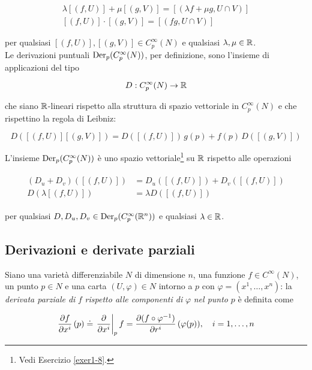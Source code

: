 \begin{gather}
	\lambda [(f,U)] + \mu [(g,V)] = [(\lambda f + \mu g , U \cap V)] \\
	[(f,U)] \cdot [(g,V)] = [(f g , U \cap V)]
\end{gather}

per qualsiasi $ [(f,U)], [(g,V)] \in C_{p}^{\infty}(N) $ e qualsiasi $ \lambda, \mu \in \mathbb{R} $. \\
Le derivazioni puntuali $ \operatorname{Der}_{p}(C_{p}^{\infty}(N)) $, per definizione, sono l'insieme di applicazioni del tipo

\begin{equation}
	D : C_{p}^{\infty}(N) \to \mathbb{R}
\end{equation}

che siano $ \mathbb{R} $-lineari rispetto alla struttura di spazio vettoriale in $ C_{p}^{\infty}(N) $ e che rispettino la regola di Leibniz:

\begin{equation}
	D([(f,U)] [(g,V)]) = D([(f,U)]) \, g(p) + f(p) \, D([(g,V)])
\end{equation}

L'insieme $ \operatorname{Der}_{p}(C_{p}^{\infty}(N)) $ è uno spazio vettoriale\footnote{%
	Vedi Esercizio \ref{exer1-8}.%
} su $ \mathbb{R} $ rispetto alle operazioni

\begin{align}
	\begin{split}
		(D_{u} + D_{v}) ([(f,U)]) &= D_{u}([(f,U)]) + D_{v}([(f,U)]) \\
		D (\lambda [(f,U)]) &= \lambda D ([(f,U)])
	\end{split}
\end{align}

per qualsiasi $ D,D_{u},D_{v} \in \operatorname{Der}_{p}(C_{p}^{\infty}(\mathbb{R}^{n})) $ e qualsiasi $ \lambda \in \mathbb{R} $.

\subsection{Derivazioni e derivate parziali}

Siano una varietà differenziabile $ N $ di dimensione $ n $, una funzione $ f \in C^{\infty}(N) $, un punto $ p \in N $ e una carta $ (U, \varphi) \in N $ intorno a $ p $ con $ \varphi = (x^{1},\dots,x^{n}) $: la \textit{derivata parziale di} $ f $ \textit{rispetto alle componenti di} $ \varphi $ \textit{nel punto} $ p $ è definita come

\begin{equation}
	\pdv{f}{x^{i}} \, (p) \doteq \eval{ \pdv{x^{i}} }_{p} f = \pdv{(f \circ \varphi^{-1})}{r^{i}} \, (\varphi(p)) \qcomma i=1,\dots,n
\end{equation}

